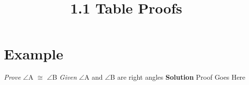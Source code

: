 \documentclass{article}
\begin{document}
\setlength{\droptitle}{-5em}
\title{1.1 Table Proofs}
\date{}
\author{}
\maketitle

\section{Example}
\textit{Prove} $\angle$A $\cong$ $\angle$B \newline \newline
\textit{Given} $\angle$A and $\angle$B are right angles\newline \newline
\textbf{Solution} \newline
Proof Goes Here



\end{document}
